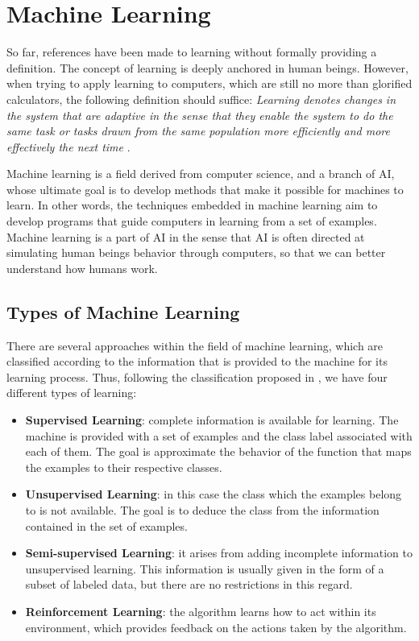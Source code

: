 \section{Machine Learning}

So far, references have been made to learning without formally providing a definition. The concept of learning is deeply anchored in human beings. However, when trying to apply learning to computers, which are still no more than glorified calculators, the following definition should suffice: \textit{Learning denotes changes in the system that are adaptive in the sense that they enable the system to do the same task or tasks drawn from the same population more efficiently and more effectively the next time} \cite{Michalski:2013:MLA:2588013}.

Machine learning is a field derived from computer science, and a branch of \acf{AI}, whose ultimate goal is to develop methods that make it possible for machines to learn. In other words, the techniques embedded in machine learning aim to develop programs that guide computers in learning from a set of examples. Machine learning is a part of \acs{AI} in the sense that \acs{AI} is often directed at simulating human beings behavior through computers, so that we can better understand how humans work.

\subsection{Types of Machine Learning} \label{sec:TypesOfML}

There are several approaches within the field of machine learning, which are classified according to the information that is provided to the machine for its learning process. Thus, following the classification proposed in \cite{ayodele2010types}, we have four different types of learning:

\begin{itemize}
	
	\item \textbf{Supervised Learning}: complete information is available for learning. The machine is provided with a set of examples and the class label associated with each of them. The goal is approximate the behavior of the function that maps the examples to their respective classes.
	
	\item \textbf{Unsupervised Learning}: in this case the class which the examples belong to is not available. The goal is to deduce the class from the information contained in the set of examples.
	
	\item \textbf{Semi-supervised Learning}: it arises from adding incomplete information to unsupervised learning. This information is usually given in the form of a subset of labeled data, but there are no restrictions in this regard.
	
	\item \textbf{Reinforcement Learning}: the algorithm learns how to act within its environment, which provides feedback on the actions taken by the algorithm.
	
\end{itemize}

